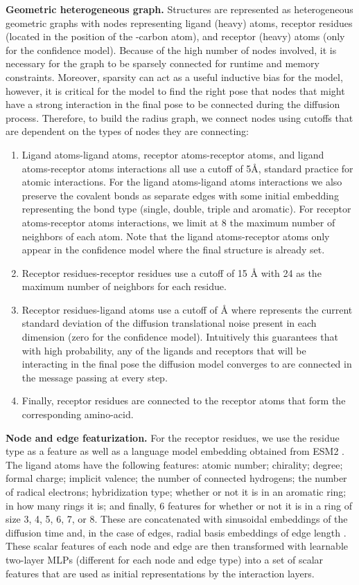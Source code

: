 \documentclass{article} \usepackage{iclr2023_conference,times}
\begin{document}
\textbf{Geometric heterogeneous graph.} Structures are represented as heterogeneous geometric graphs with nodes representing ligand (heavy) atoms, receptor residues (located in the position of the -carbon atom), and receptor (heavy) atoms (only for the confidence model). Because of the high number of nodes involved, it is necessary for the graph to be sparsely connected for runtime and memory constraints. Moreover, sparsity can act as a useful inductive bias for the model, however, it is critical for the model to find the right pose that nodes that might have a strong interaction in the final pose to be connected during the diffusion process. Therefore, to build the radius graph, we connect nodes using cutoffs that are dependent on the types of nodes they are connecting:
\begin{enumerate}
    \item Ligand atoms-ligand atoms, receptor atoms-receptor atoms, and ligand atoms-receptor atoms interactions all use a cutoff of 5\AA{}, standard practice for atomic interactions. For the ligand atoms-ligand atoms interactions we also preserve the covalent bonds as separate edges with some initial embedding representing the bond type (single, double, triple and aromatic). For receptor atoms-receptor atoms interactions, we limit at 8 the maximum number of neighbors of each atom. Note that the ligand atoms-receptor atoms only appear in the confidence model where the final structure is already set.
    \item Receptor residues-receptor residues use a cutoff of 15 \AA{} with 24 as the maximum number of neighbors for each residue.
    \item Receptor residues-ligand atoms use a cutoff of  \AA{} where  represents the current standard deviation of the diffusion translational noise present in each dimension (zero for the confidence model). Intuitively this guarantees that with high probability, any of the ligands and receptors that will be interacting in the final pose the diffusion model converges to are connected in the message passing at every step.
    \item Finally, receptor residues are connected to the receptor atoms that form the corresponding amino-acid.
\end{enumerate}


\textbf{Node and edge featurization.} For the receptor residues, we use the residue type as a feature as well as a language model embedding obtained from ESM2 \citep{Lin2022ESM2}. The ligand atoms have the following features: atomic number; chirality; degree; formal charge; implicit valence; the number of connected hydrogens; the number of radical electrons; hybridization type; whether or not it is in an aromatic ring; in how many rings it is; and finally, 6 features for whether or not it is in a ring of size 3, 4, 5, 6, 7, or 8. These are concatenated with sinusoidal embeddings of the diffusion time \citep{vaswani2017attention} and, in the case of edges, radial basis embeddings of edge length \citep{schutt2017schnet}. These scalar features of each node and edge are then transformed with learnable two-layer MLPs (different for each node and edge type) into a set of scalar features that are used as initial representations by the interaction layers.
\end{document}
